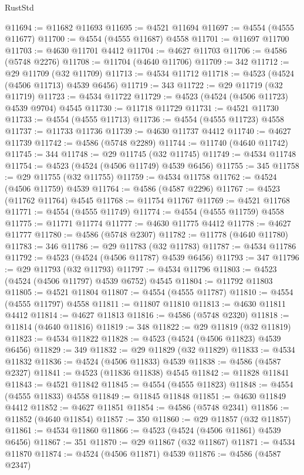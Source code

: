 \begin{lexlean}{RustStd}
\begin{coremodule}
@11694 := @11682 @11693
@11695 := @4521 @11694
@11697 := @4554 (@4555 @11677)
@11700 := @4554 (@4555 @11687) @4558
@11701 := @11697 @11700
@11703 := @4630 @11701 @4412
@11704 := @4627 @11703
@11706 := @4586 (@5748 @2276)
@11708 := @11704 (@4640 @11706)
@11709 := 342
@11712 := @29 @11709 (@32 @11709)
@11713 := @4534 @11712
@11718 := @4523 (@4524 (@4506 @11713) @4539 @6456)
@11719 := 343
@11722 := @29 @11719 (@32 @11719)
@11723 := @4534 @11722
@11729 := @4523 (@4524 (@4506 @11723) @4539 @9704) @4545
@11730 := @11718 @11729
@11731 := @4521 @11730
@11733 := @4554 (@4555 @11713)
@11736 := @4554 (@4555 @11723) @4558
@11737 := @11733 @11736
@11739 := @4630 @11737 @4412
@11740 := @4627 @11739
@11742 := @4586 (@5748 @2289)
@11744 := @11740 (@4640 @11742)
@11745 := 344
@11748 := @29 @11745 (@32 @11745)
@11749 := @4534 @11748
@11754 := @4523 (@4524 (@4506 @11749) @4539 @6456)
@11755 := 345
@11758 := @29 @11755 (@32 @11755)
@11759 := @4534 @11758
@11762 := @4524 (@4506 @11759) @4539
@11764 := @4586 (@4587 @2296)
@11767 := @4523 (@11762 @11764) @4545
@11768 := @11754 @11767
@11769 := @4521 @11768
@11771 := @4554 (@4555 @11749)
@11774 := @4554 (@4555 @11759) @4558
@11775 := @11771 @11774
@11777 := @4630 @11775 @4412
@11778 := @4627 @11777
@11780 := @4586 (@5748 @2307)
@11782 := @11778 (@4640 @11780)
@11783 := 346
@11786 := @29 @11783 (@32 @11783)
@11787 := @4534 @11786
@11792 := @4523 (@4524 (@4506 @11787) @4539 @6456)
@11793 := 347
@11796 := @29 @11793 (@32 @11793)
@11797 := @4534 @11796
@11803 := @4523 (@4524 (@4506 @11797) @4539 @6752) @4545
@11804 := @11792 @11803
@11805 := @4521 @11804
@11807 := @4554 (@4555 @11787)
@11810 := @4554 (@4555 @11797) @4558
@11811 := @11807 @11810
@11813 := @4630 @11811 @4412
@11814 := @4627 @11813
@11816 := @4586 (@5748 @2320)
@11818 := @11814 (@4640 @11816)
@11819 := 348
@11822 := @29 @11819 (@32 @11819)
@11823 := @4534 @11822
@11828 := @4523 (@4524 (@4506 @11823) @4539 @6456)
@11829 := 349
@11832 := @29 @11829 (@32 @11829)
@11833 := @4534 @11832
@11836 := @4524 (@4506 @11833) @4539
@11838 := @4586 (@4587 @2327)
@11841 := @4523 (@11836 @11838) @4545
@11842 := @11828 @11841
@11843 := @4521 @11842
@11845 := @4554 (@4555 @11823)
@11848 := @4554 (@4555 @11833) @4558
@11849 := @11845 @11848
@11851 := @4630 @11849 @4412
@11852 := @4627 @11851
@11854 := @4586 (@5748 @2341)
@11856 := @11852 (@4640 @11854)
@11857 := 350
@11860 := @29 @11857 (@32 @11857)
@11861 := @4534 @11860
@11866 := @4523 (@4524 (@4506 @11861) @4539 @6456)
@11867 := 351
@11870 := @29 @11867 (@32 @11867)
@11871 := @4534 @11870
@11874 := @4524 (@4506 @11871) @4539
@11876 := @4586 (@4587 @2347)

\end{coremodule}
\end{lexlean}

